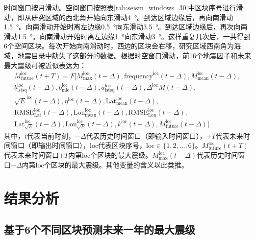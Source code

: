 时间窗口按月滑动。空间窗口按照表\ref{tab:seism_windows_30}中区块序号进行滑动，即从研究区域的西北角开始向东滑动\SI{4}{\degree}。到达区域边缘后，再向南滑动\SI{1.5}{\degree}。向南滑动开始时离左边缘\SI{0.5}{\degree}向东滑动\SI{3.5}{\degree}。到达区域边缘后，再次向南滑动\SI{1.5}{\degree}。向南滑动开始时离左边缘\SI{1}{\degree}向东滑动\SI{3}{\degree}。这样重复几次后，一共得到6个空间区块。每次开始向南滑动时，西边的区块会右移，研究区域西南角为海域，地震目录中缺失了这部分的数据。根据时空窗口滑动，前16个地震因子和未来最大震级可被近似表达为：
\begin{equation}
  \label{eq:seism_m_indicator}
  \begin{split}
    M_{\text{future}}^{\text{loc}}(t+T)=F[M_{\text{max}}^{\text{loc}}(t-\Delta ),\text{frequency}^{\text{loc}}(t-\Delta ),M_{\text{mean}}^{\text{loc}}(t-\Delta ),\\
    b_{\text{lstsq}}^{\text{loc}}(t-\Delta ),b_{\text{mle}}^{\text{loc}}(t-\Delta ),a_{\text{lstsq}}^{\text{loc}}(t-\Delta ),\Delta^{\text{loc}}M(t-\Delta ),\\
    \sqrt{E}^{\text{loc}}(t-\Delta ),\eta^{\text{loc}}(t-\Delta ),\text{Lat}_{\text{mean}}^{\text{loc}}(t-\Delta ),\\
    \text{RMSE}_{\text{Lat}}^{\text{loc}}(t-\Delta ),\text{Lon}_{\text{mean}}^{\text{loc}}(t-\Delta ),\text{RMSE}_{\text{Lon}}^{\text{loc}}(t-\Delta ),
    \\
    \text{Lat}^{\text{loc}}_{\sqrt{E}}(t-\Delta),\text{Lon}^{\text{loc}}_{\sqrt{E}}(t-\Delta ),k^{\text{loc}}(t-\Delta),M_{\text{future}}^{\text{loc}}(t-\Delta)]
  \end{split}
\end{equation}
其中，$t$代表当前时刻，$-\Delta $代表历史时间窗口（即输入时间窗口），$+T$代表未来时间窗口（即输出时间窗口），$\text{loc}$代表区块序号，$\text{loc}\in\{1,2,\ldots,6\}$。$M_{\text{future}}^{\text{loc}}(t+T)$代表未来时间窗口$+T$内第$\text{loc}$个区块的最大震级。$M_{\text{max}}^{\text{loc}}(t- \Delta )$代表历史时间窗口$- \Delta $内第$\text{loc}$个区块的最大震级。其他变量的含义以此类推。

\section{结果分析}\label{sec:seism_result}

\subsection{基于6个不同区块预测未来一年的最大震级}\label{sec:seism_result_6}

